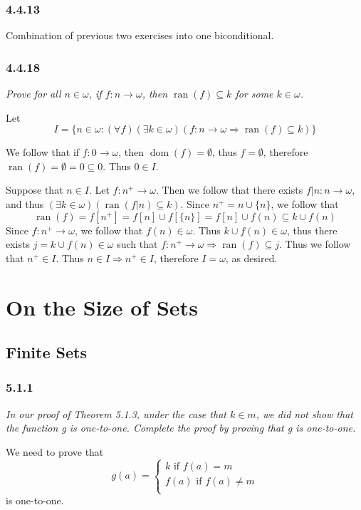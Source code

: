 \documentclass[11pt,oneside,titlepage]{book}
\DeclareMathOperator \ra {\Rightarrow}
\DeclareMathOperator \dom {dom}
\DeclareMathOperator \ran {ran}
\begin{document}
\subsection*{4.4.13}

Combination of previous two exercises into one biconditional.

\subsection*{4.4.18}

\textit{Prove for all $n \in \omega$, if $f: n \to \omega$, then $\ran(f) \subseteq k$ for
  some $k \in \omega$.}


Let
$$I = \{n \in \omega: (\forall f)
(\exists k \in \omega)(f: n \to \omega \ra \ran(f) \subseteq k)\}$$

We follow that if $f: 0 \to \omega$, then $\dom(f) = \emptyset$, thus $f = \emptyset$, therefore
$\ran(f) = \emptyset = 0 \subseteq 0$. Thus $0 \in I$.

Suppose that $n \in I$. Let $f: n^+ \to \omega$. Then we follow that
there exists $f|n: n \to \omega$, and thus $(\exists k \in \omega)(\ran(f|n) \subseteq k)$.
Since $n^+ = n \cup \{n\}$, we follow that
$$\ran(f) = f[n^+] = f[n] \cup f[\{n\}] = f[n] \cup f(n) \subseteq k \cup f(n)$$
Since $f: n^+ \to \omega$, we follow that $f(n) \in \omega$. Thus $k \cup f(n) \in \omega$,
thus there exists $j = k \cup f(n) \in \omega$ such that
$f: n^+ \to \omega \ra \ran(f) \subseteq j$. Thus we follow that $n^+ \in I$.
Thus $n \in I \ra n^+ \in I$, therefore $I = \omega$, as desired.


\chapter{On the Size of Sets}

\section{Finite Sets}

\subsection*{5.1.1}

\textit{In our proof of Theorem 5.1.3, under the case that $k \in m$, we did not show
that the function g is one-to-one. Complete the proof by proving that g is
one-to-one.}

We need to prove that
$$g(a) =
\begin{cases}
  k \text{ if } f(a) = m \\
  f(a) \text{ if } f(a) \neq m \\
\end{cases}
$$
is one-to-one.
\end{document}
